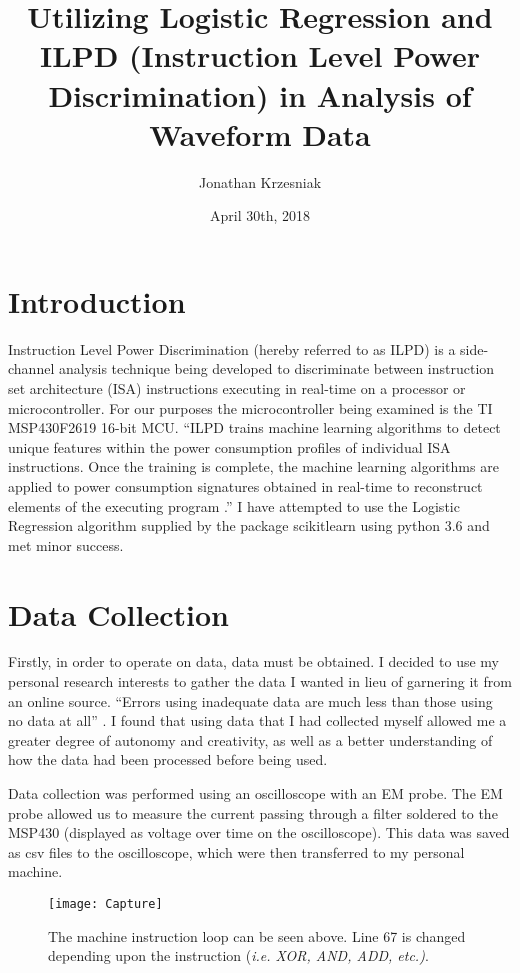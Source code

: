 \documentclass{article}
\title{Utilizing Logistic Regression and ILPD (Instruction Level Power Discrimination) in Analysis of Waveform Data}
\author{Jonathan Krzesniak}
\date{April 30th, 2018}
\newcommand\tab[1][1cm]{\hspace*{#1}}
\begin{document}
\maketitle

\section{Introduction}

\tab    
Instruction Level Power Discrimination (hereby referred to as ILPD) is a side-channel analysis technique being developed to discriminate between instruction set architecture (ISA) instructions executing in real-time on a processor or microcontroller. For our purposes the microcontroller being examined is the TI MSP430F2619 16-bit MCU. “ILPD trains machine learning algorithms to detect unique features within the power consumption profiles of individual ISA instructions. Once the training is complete, the machine learning algorithms are applied to power consumption signatures obtained in real-time to reconstruct elements of the executing program \cite{duncan}.” I have attempted to use the Logistic Regression algorithm supplied by the package scikitlearn using python 3.6 and met minor success. 

\section{Data Collection} 
\tab 
	Firstly, in order to operate on data, data must be obtained. I decided to use my personal research interests to gather the data I wanted in lieu of garnering it from an online source. “Errors using inadequate data are much less than those using no data at all” \cite{babbage}. I found that using data that I had collected myself allowed me a greater degree of autonomy and creativity, as well as a better understanding of how the data had been processed before being used.
	

	Data collection was performed using an oscilloscope with an EM probe. The EM probe allowed us to measure the current passing through a filter soldered to the MSP430 (displayed as voltage over time on the oscilloscope). This data was saved as csv files to the oscilloscope, which were then transferred to my personal machine.
	
\begin{figure}
    \centering
    \texttt{[image: Capture]}
    \caption{The machine instruction loop can be seen above. Line 67 is changed depending upon the instruction (\textit{i.e. XOR, AND, ADD, etc.)}.}
    \label{fig:my_label}
\end{figure}
	
\end{document}
